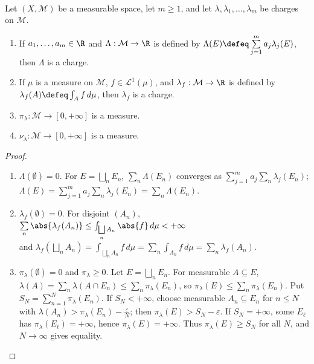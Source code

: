 \begin{proposition} \label{prop:charges-linear-combinations-and-variation} \\
Let $(X,\mathcal{M})$ be a measurable space, let $m\geq1$, and let $\lambda,\lambda_1,\ldots,\lambda_m$ be charges on $\mathcal{M}$.
\begin{enumerate}[label=(\roman*)]
\setlength{\itemsep}{0pt}
\item If $a_1,\ldots,a_m\in\R$ and $\Lambda:\mathcal{M}\to\R$ is defined by $\Lambda(E)\defeq\sum\limits_{j=1}^{m}a_j\lambda_j(E)$, then $\Lambda$ is a charge.
\item If $\mu$ is a measure on $\mathcal{M}$, $f\in\mathscr{L}^1(\mu)$, and $\lambda_f:\mathcal{M}\to\R$ is defined by $\lambda_f(A)\defeq\int_A f\,d\mu$, then $\lambda_f$ is a charge.
\item $\pi_\lambda:\mathcal{M}\to[0,+\infty]$ is a measure.
\item $\nu_\lambda:\mathcal{M}\to[0,+\infty]$ is a measure.
\end{enumerate}
\begin{proof}
\begin{enumerate}[label=(\roman*)]
\setlength{\itemsep}{0pt}
\item $\Lambda(\emptyset)=0$. For $E=\bigsqcup\limits_nE_n$, $\sum\limits_n\Lambda(E_n)$ converges as $\sum\limits_{j=1}^{m}a_j\sum\limits_n\lambda_j(E_n)$; $\Lambda(E)=\sum\limits_{j=1}^{m}a_j\sum\limits_n\lambda_j(E_n)=\sum\limits_n\Lambda(E_n)$.
\item $\lambda_f(\emptyset)=0$. For disjoint $(A_n)$, $\sum\limits_n\abs{\lambda_f(A_n)}\leq\int_{\bigsqcup\limits_nA_n}\abs{f}\,d\mu<+\infty$\\
and $\lambda_f(\bigsqcup\limits_nA_n)=\int_{\bigsqcup\limits_nA_n}f\,d\mu=\sum\limits_n\int_{A_n}f\,d\mu=\sum\limits_n\lambda_f(A_n)$.
\item $\pi_\lambda(\emptyset)=0$ and $\pi_\lambda\geq0$. Let $E=\bigsqcup\limits_nE_n$. For measurable $A\subseteq E$, $\lambda(A)=\sum\limits_n\lambda(A\cap E_n)\leq\sum\limits_n\pi_\lambda(E_n)$, so $\pi_\lambda(E)\leq\sum\limits_n\pi_\lambda(E_n)$. Put $S_N=\sum\limits_{n=1}^{N}\pi_\lambda(E_n)$. If $S_N<+\infty$, choose measurable $A_n\subseteq E_n$ for $n\leq N$ with $\lambda(A_n)>\pi_\lambda(E_n)-\frac{\varepsilon}{N}$; then $\pi_\lambda(E)>S_N-\varepsilon$. If $S_N=+\infty$, some $E_\ell$ has $\pi_\lambda(E_\ell)=+\infty$, hence $\pi_\lambda(E)=+\infty$. Thus $\pi_\lambda(E)\geq S_N$ for all $N$, and $N\to\infty$ gives equality.

\end{enumerate}
\end{proof}
\end{proposition}
